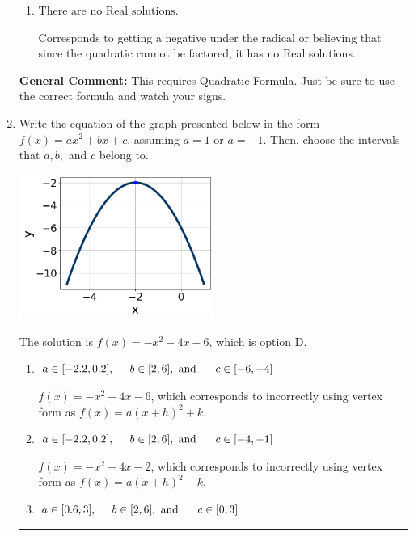 \documentclass{extbook}[14pt]
\newcommand{\litem}[1]{\item #1

\rule{\textwidth}{0.4pt}}
\begin{document}
\begin{enumerate}
{\begin{enumerate}[label=\Alph*.]
 $x_1 = -25.027 \text{ and } x_2 = 25.884$, which corresponds to writing the Quadratic Formula as $-\frac{b}{2a} \pm \sqrt{b^2 - 4ac}$.
\item \( \text{There are no Real solutions.} \)

Corresponds to getting a negative under the radical or believing that since the quadratic cannot be factored, it has no Real solutions.
\end{enumerate}

\textbf{General Comment:} This requires Quadratic Formula. Just be sure to use the correct formula and watch your signs.
}
\litem{
Write the equation of the graph presented below in the form $f(x)=ax^2+bx+c$, assuming  $a=1$ or $a=-1$. Then, choose the intervals that $a, b,$ and $c$ belong to.

\begin{center}
    \includegraphics[width=0.5\textwidth]{../Figures/quadraticGraphToEquationC.png}
\end{center}




The solution is \( f(x) = -x^{2} -4 x -6 \), which is option D.\begin{enumerate}[label=\Alph*.]
\item \( a \in [-2.2, 0.2], \hspace*{5mm} b \in [2, 6], \text{ and } \hspace*{5mm} c \in [-6, -4] \)

$f(x)=-x^{2} +4 x -6$, which corresponds to incorrectly using vertex form as $f(x) = a(x+h)^2+k$.
\item \( a \in [-2.2, 0.2], \hspace*{5mm} b \in [2, 6], \text{ and } \hspace*{5mm} c \in [-4, -1] \)

$f(x)=-x^{2} +4 x -2$, which corresponds to incorrectly using vertex form as $f(x) = a(x+h)^2 - k$.
\item \( a \in [0.6, 3], \hspace*{5mm} b \in [2, 6], \text{ and } \hspace*{5mm} c \in [0, 3] \)


\end{enumerate}}
\end{enumerate}
\end{document}
